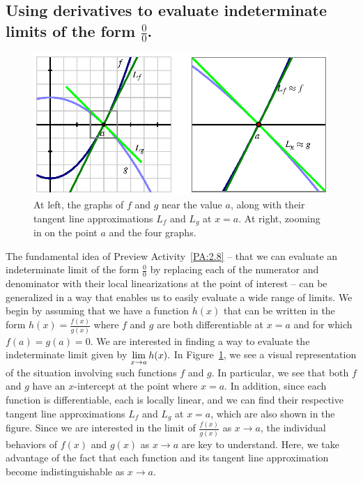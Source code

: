 

\subsection*{Using derivatives to evaluate indeterminate limits of the form $\frac{0}{0}$.}

\begin{figure}[h]
\begin{center}
\includegraphics{figures/2_8_LHR.eps}
\caption{At left, the graphs of $f$ and $g$ near the value $a$, along with their tangent line approximations $L_f$ and $L_g$ at $x = a$.  At right, zooming in on the point $a$ and the four graphs.} \label{F:2.8.LHR}
\end{center}
\end{figure}

The fundamental idea of Preview Activity~\ref{PA:2.8} -- that we can evaluate an indeterminate limit of the form $\frac{0}{0}$ by replacing each of the numerator and denominator with their local linearizations at the point of interest -- can be generalized in a way that enables us to easily evaluate a wide range of limits.  We begin by assuming that we have a function $h(x)$ that can be written in the form $h(x) = \frac{f(x)}{g(x)}$ where $f$ and $g$ are both differentiable at $x=a$ and for which $f(a) = g(a) = 0$.  We are interested in finding a way to evaluate the indeterminate limit given by
$\displaystyle \lim_{x \to a} h(x).$
In Figure~\ref{F:2.8.LHR}, we see a visual representation of the situation involving such functions $f$ and $g$.  In particular, we see that both $f$ and $g$ have an $x$-intercept at the point where $x = a$.  In addition, since each function is differentiable, each is locally linear, and we can find their respective tangent line approximations $L_f$ and $L_g$ at $x = a$, which are also shown in the figure.  Since we are interested in the limit of $\frac{f(x)}{g(x)}$ as $x \to a$, the individual behaviors of $f(x)$ and $g(x)$ as $x \to a$ are key to understand.  Here, we take advantage of the fact that each function and its tangent line approximation become indistinguishable as $x \to a$.

